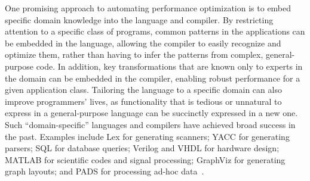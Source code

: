 
One promising approach to automating performance optimization is to
embed specific domain knowledge into the language and compiler.  By
restricting attention to a specific class of programs, common patterns
in the applications can be embedded in the language, allowing the
compiler to easily recognize and optimize them, rather than having to
infer the patterns from complex, general-purpose code.  In addition,
key transformations that are known only to experts in the domain can
be embedded in the compiler, enabling robust performance for a given
application class.  Tailoring the language to a specific domain can
also improve programmers' lives, as functionality that is tedious or
unnatural to express in a general-purpose language can be succinctly
expressed in a new one.  Such ``domain-specific'' languages and
compilers have achieved broad success in the past.  Examples include
Lex for generating scanners; YACC for generating parsers; SQL for
database queries; Verilog and VHDL for hardware design; MATLAB for
scientific codes and signal processing; GraphViz for generating graph
layouts; and PADS for processing ad-hoc
data~\cite{fisher_pads:domain-specific_2005}.


